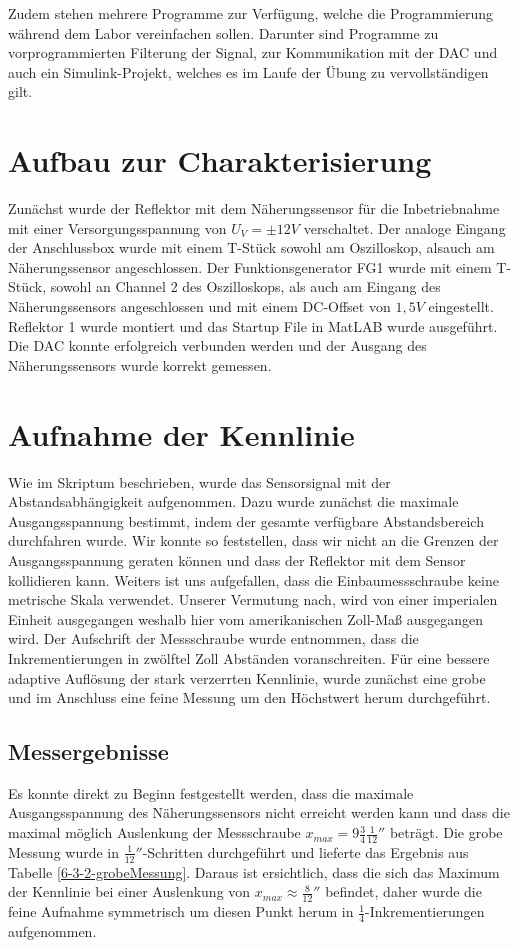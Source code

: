 \documentclass[a4paper]{article}
\begin{document}
Zudem stehen mehrere Programme zur Verfügung, welche die Programmierung während
dem Labor vereinfachen sollen. Darunter sind Programme zu vorprogrammierten
Filterung der Signal, zur Kommunikation mit der DAC und auch ein Simulink-Projekt,
welches es im Laufe der Übung zu vervollständigen gilt.

\section{Aufbau zur Charakterisierung}
Zunächst wurde der Reflektor mit dem Näherungssensor für die Inbetriebnahme mit
einer Versorgungsspannung von $U_{V}=\pm12\unit{V}$ verschaltet. Der analoge
Eingang der Anschlussbox wurde mit einem T-Stück sowohl am Oszilloskop, alsauch
am Näherungssensor angeschlossen. Der Funktionsgenerator FG1 wurde mit einem T-Stück,
sowohl an Channel 2 des Oszilloskops, als auch am Eingang des Näherungssensors
angeschlossen und mit einem DC-Offset von $1,5 \unit{V}$ eingestellt.
Reflektor 1 wurde montiert und das Startup File in MatLAB wurde ausgeführt. Die
DAC konnte erfolgreich verbunden werden und der Ausgang des Näherungssensors wurde
korrekt gemessen.

\section{Aufnahme der Kennlinie}
Wie im Skriptum beschrieben, wurde das Sensorsignal mit der Abstandsabhängigkeit
aufgenommen. Dazu wurde zunächst die maximale Ausgangsspannung bestimmt, indem
der gesamte verfügbare Abstandsbereich durchfahren wurde. Wir konnte so feststellen,
dass wir nicht an die Grenzen der Ausgangsspannung geraten können und dass der
Reflektor mit dem Sensor kollidieren kann.\newline
Weiters ist uns aufgefallen, dass die Einbaumessschraube keine metrische Skala
verwendet. Unserer Vermutung nach, wird von einer imperialen Einheit ausgegangen
weshalb hier vom amerikanischen Zoll-Maß ausgegangen wird. Der Aufschrift 
der Messschraube wurde entnommen, dass die Inkrementierungen in zwölftel Zoll
Abständen voranschreiten.\newline
Für eine bessere adaptive Auflösung der stark verzerrten Kennlinie, wurde
zunächst eine grobe und im Anschluss eine feine Messung um den Höchstwert herum
durchgeführt.

\subsection{Messergebnisse}
Es konnte direkt zu Beginn festgestellt werden, dass die maximale Ausgangsspannung
des Näherungssensors nicht erreicht werden kann und dass die maximal möglich
Auslenkung der Messschraube $x_{max}=9 \frac{3}{4} \frac{1}{12}''$ beträgt.
Die grobe Messung wurde in $\frac{1}{12}''$-Schritten durchgeführt und lieferte
das Ergebnis aus Tabelle \ref{6-3-2-grobeMessung}. Daraus ist ersichtlich, dass
die sich das Maximum der Kennlinie bei einer Auslenkung von
$x_{max}\approx \frac{8}{12}''$ befindet, daher wurde die feine Aufnahme
symmetrisch um diesen Punkt herum in $\frac{1}{4}$-Inkrementierungen aufgenommen.
\end{document}
